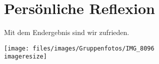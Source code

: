 \section{Persönliche Reflexion}
\label{sec:Robin:reflexion}

Mit dem Endergebnis sind wir zufrieden.

\begin{figurewrapper}
	\texttt{[image: files/images/Gruppenfotos/IMG\_8096\\imageresize]}
	\label{fig:group_picture}
\end{figurewrapper}
